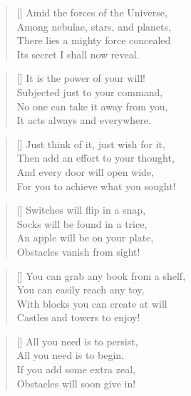 \documentclass[a5paper,11pt]{memoir}
\begin{document}
\PlainPoemTitle
{}
\begin{multicols}{2}


\begin{verse}[\versewidth]
Amid the forces of the Universe,\\
Among nebulae, stars, and planets,\\
There lies a mighty force concealed\\
Its secret I shall now reveal.
\end{verse}

\begin{verse}[\versewidth]
It is the power of your will!\\
Subjected just to your command,\\
No one can take it away from you,\\
It acts always and everywhere.
\end{verse}

\begin{verse}[\versewidth]
Just think of it, just wish for it,\\
Then add an effort to your thought,\\
And every door will open wide,\\
For you to achieve what you sought!
\end{verse}


\begin{verse}[\versewidth]
Switches will flip in a snap,\\
Socks will be found in a trice,\\
An apple will be on your plate,\\
Obstacles vanish from sight!
\end{verse}

\begin{verse}[\versewidth]
You can grab any book from a shelf,\\
You can easily reach any toy,\\
With blocks you can create at will\\
Castles and towers to enjoy!
\end{verse}

\begin{verse}[\versewidth]
All you need is to persist,\\
All you need is to begin,\\
If you add some extra zeal,\\
Obstacles will soon give in!
\end{verse}


\end{multicols}
\end{document}
